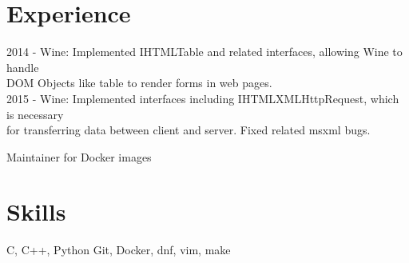 

\section{Experience}

{
	{2014 - Wine: Implemented IHTMLTable and related interfaces, allowing Wine to handle \\
	\phantom{2015 }DOM Objects like table to render forms in web pages.}\\
	{2015 - Wine: Implemented interfaces including IHTMLXMLHttpRequest, which is necessary \\
	\phantom{2016 }for transferring data between client and server. Fixed related msxml bugs.}
}





{
Maintainer for Docker images
}

\vspace{-5mm}

\section{Skills}
{ C, C++, Python
	}
{Git, Docker, dnf, vim, make
	}
%




